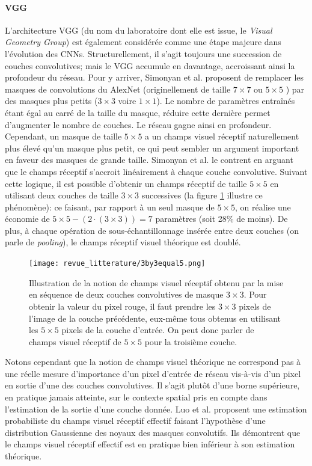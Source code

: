 \paragraph{VGG}
\label{par:VGG}
L'architecture VGG (du nom du laboratoire dont elle est issue, le \textit{Visual Geometry Group}) \cite{simonyanVeryDeepConvolutional2015a} est également considérée comme une étape majeure dans l'évolution des \ac{CNN}s. Structurellement, il s'agit toujours une succession de couches convolutives; mais le VGG accumule en davantage, accroissant ainsi la profondeur du réseau. Pour y arriver, Simonyan et al. proposent de remplacer les masques de convolutions du AlexNet (originellement de taille $7 \times 7$ ou $5 \times 5$ ) par des masques plus petits ($3 \times 3$ voire $1 \times 1$). Le nombre de paramètres entraînés étant égal au carré de la taille du masque, réduire cette dernière permet d'augmenter le nombre de couches. Le réseau gagne ainsi en profondeur. Cependant, un masque de taille $5 \times 5$ a un champs visuel réceptif naturellement plus élevé qu'un masque plus petit, ce qui peut sembler un argument important en faveur des masques de grande taille. Simonyan et al. le contrent en arguant que le champs réceptif s'accroit linéairement à chaque couche convolutive. Suivant cette logique, il est possible d'obtenir un champs réceptif de taille $5 \times 5$ en utilisant deux couches de taille $3 \times 3$ successives (la figure \ref{fig:TheoricalReceptiveField} illustre ce phénomène): ce faisant, par rapport à un seul masque de $5 \times 5$, on réalise une économie de $5 \times 5 - (2\cdot (3\times 3)) = 7$ paramètres (soit 28\% de moins). De plus, à chaque opération de sous-échantillonnage insérée entre deux couches (on parle de \textit{pooling}), le champs réceptif visuel théorique est doublé.

\begin{figure}[htb]
	\centering
	\texttt{[image: revue\_litterature/3by3equal5.png]}
	\caption{Illustration de la notion de champs visuel réceptif obtenu par la mise en séquence de deux couches convolutives de masque $3 \times 3$. Pour obtenir la valeur du pixel rouge, il faut prendre les $3 \times 3$ pixels de l'image de la couche précédente, eux-même tous obtenus en utilisant les $5\times 5$ pixels de la couche d'entrée. On peut donc parler de champs visuel réceptif de $5 \times 5$ pour la troisième couche.}
	\label{fig:TheoricalReceptiveField}
\end{figure}
Notons cependant que la notion de champs visuel théorique ne correspond pas à une réelle mesure d'importance d'un pixel d'entrée de réseau vis-à-vis d'un pixel en sortie d'une des couches convolutives. Il s'agit plutôt d'une borne supérieure, en pratique jamais atteinte, sur le contexte spatial pris en compte dans l'estimation de la sortie d'une couche donnée. Luo et al. proposent une estimation probabiliste du champs visuel réceptif effectif \cite{luoUnderstandingEffectiveReceptive2016} faisant l'hypothèse d'une distribution Gaussienne des noyaux des masques convolutifs. Ils démontrent que le champs visuel réceptif effectif est en pratique bien inférieur à son estimation théorique.

